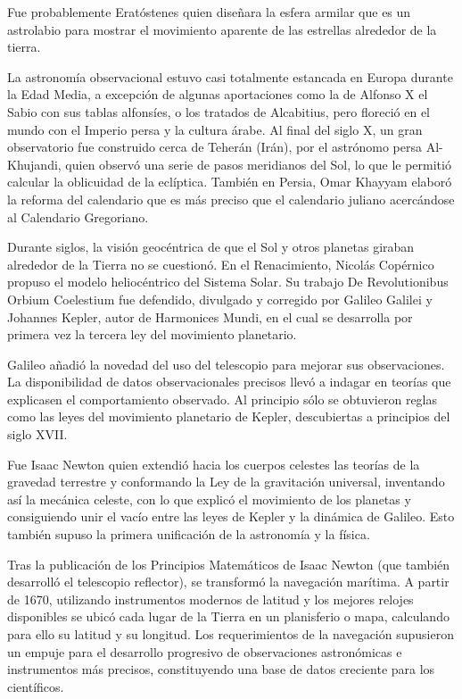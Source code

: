 Fue probablemente Eratóstenes quien diseñara la esfera armilar que es un astrolabio para mostrar el movimiento aparente de las estrellas alrededor de la tierra.

La astronomía observacional estuvo casi totalmente estancada en Europa durante la Edad Media, a excepción de algunas aportaciones como la de Alfonso X el Sabio con sus tablas alfonsíes, o los tratados de Alcabitius, pero floreció en el mundo con el Imperio persa y la cultura árabe. Al final del siglo X, un gran observatorio fue construido cerca de Teherán (Irán), por el astrónomo persa Al-Khujandi, quien observó una serie de pasos meridianos del Sol, lo que le permitió calcular la oblicuidad de la eclíptica. También en Persia, Omar Khayyam elaboró la reforma del calendario que es más preciso que el calendario juliano acercándose al Calendario Gregoriano.

Durante siglos, la visión geocéntrica de que el Sol y otros planetas giraban alrededor de la Tierra no se cuestionó. En el Renacimiento, Nicolás Copérnico propuso el modelo heliocéntrico del Sistema Solar. Su trabajo De Revolutionibus Orbium Coelestium fue defendido, divulgado y corregido por Galileo Galilei y Johannes Kepler, autor de Harmonices Mundi, en el cual se desarrolla por primera vez la tercera ley del movimiento planetario.

Galileo añadió la novedad del uso del telescopio para mejorar sus observaciones. La disponibilidad de datos observacionales precisos llevó a indagar en teorías que explicasen el comportamiento observado. Al principio sólo se obtuvieron reglas como las leyes del movimiento planetario de Kepler, descubiertas a principios del siglo XVII.

Fue Isaac Newton quien extendió hacia los cuerpos celestes las teorías de la gravedad terrestre y conformando la Ley de la gravitación universal, inventando así la mecánica celeste, con lo que explicó el movimiento de los planetas y consiguiendo unir el vacío entre las leyes de Kepler y la dinámica de Galileo. Esto también supuso la primera unificación de la astronomía y la física.

Tras la publicación de los Principios Matemáticos de Isaac Newton (que también desarrolló el telescopio reflector), se transformó la navegación marítima. A partir de 1670, utilizando instrumentos modernos de latitud y los mejores relojes disponibles se ubicó cada lugar de la Tierra en un planisferio o mapa, calculando para ello su latitud y su longitud. Los requerimientos de la navegación supusieron un empuje para el desarrollo progresivo de observaciones astronómicas e instrumentos más precisos, constituyendo una base de datos creciente para los científicos.

